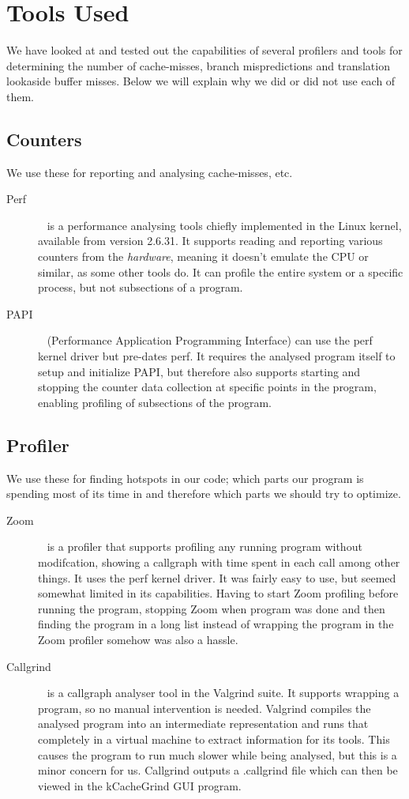 \section{Tools Used}
We have looked at and tested out the capabilities of several profilers and tools for determining the number of cache-misses, branch mispredictions and translation lookaside buffer misses.
Below we will explain why we did or did not use each of them.


\subsection{Counters}
We use these for reporting and analysing cache-misses, etc.
\begin{description}
\item[Perf]~\citep{perftool} is a performance analysing tools chiefly implemented in the Linux kernel, available from version 2.6.31.
It supports reading and reporting various counters from the \textit{hardware}, meaning it doesn't emulate the CPU or similar, as some other tools do.
It can profile the entire system or a specific process, but not subsections of a program.
\item[PAPI]~\citep{PAPI} (Performance Application Programming Interface) can use the perf kernel driver but pre-dates perf.
It requires the analysed program itself to setup and initialize PAPI, but therefore also supports starting and stopping the counter data collection at specific points in the program, enabling profiling of subsections of the program.
\end{description}

\subsection{Profiler}
We use these for finding hotspots in our code; which parts our program is spending most of its time in and therefore which parts we should try to optimize.

\begin{description}
\item[Zoom]~\citep{zoomprofiler} is a profiler that supports profiling any running program without modifcation, showing a callgraph with time spent in each call among other things.
It uses the perf kernel driver. It was fairly easy to use, but seemed somewhat limited in its capabilities.
Having to start Zoom profiling before running the program, stopping Zoom when program was done and then finding the program in a long list instead of wrapping the program in the Zoom profiler somehow was also a hassle.
\item[Callgrind]~\citep{callgrind} is a callgraph analyser tool in the Valgrind suite.
It supports wrapping a program, so no manual intervention is needed.
Valgrind compiles the analysed program into an intermediate representation and runs that completely in a virtual machine to extract information for its tools.
This causes the program to run much slower while being analysed, but this is a minor concern for us.
Callgrind outputs a .callgrind file which can then be viewed in the kCacheGrind GUI program.
\end{description}
